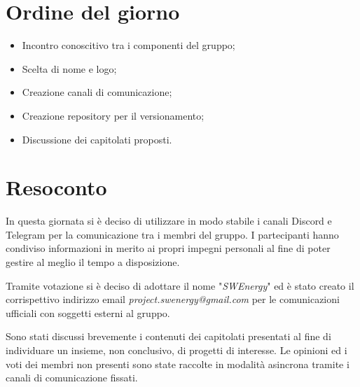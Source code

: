 \section{Ordine del giorno}
\begin{itemize}
    \item Incontro conoscitivo tra i componenti del gruppo;
    \item Scelta di nome e logo;
    \item Creazione canali di comunicazione;
    \item Creazione repository per il versionamento;
    \item Discussione dei capitolati proposti.
\end{itemize}

\section{Resoconto}
In questa giornata si è deciso di utilizzare in modo stabile i canali Discord e Telegram per la comunicazione tra i membri del gruppo.
I partecipanti hanno condiviso informazioni in merito ai propri impegni personali al fine di poter gestire al meglio il tempo a disposizione. 

Tramite votazione si è deciso di adottare il nome "\textit{SWEnergy}" ed è stato creato il corrispettivo indirizzo email \textit{project.swenergy@gmail.com} per le comunicazioni ufficiali con soggetti esterni al gruppo. 

Sono stati discussi brevemente i contenuti dei capitolati presentati al fine di individuare un insieme, non conclusivo, di progetti di interesse.
Le opinioni ed i voti dei membri non presenti sono state raccolte in modalità asincrona tramite i canali di comunicazione fissati.
